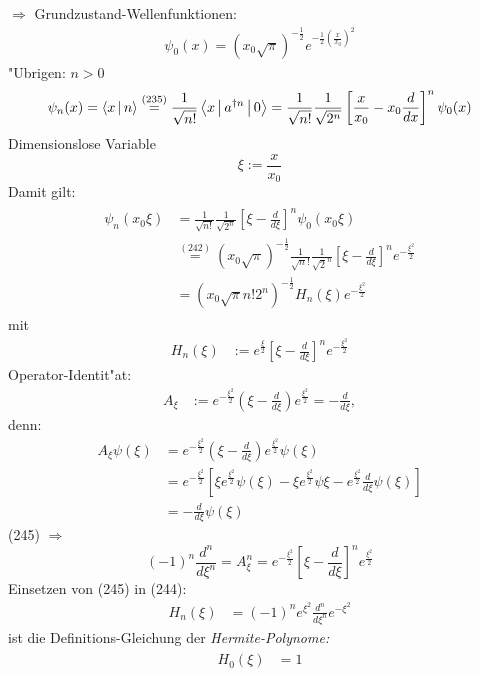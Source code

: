 \documentclass[a4paper]{scrartcl}
\begin{document}
{$\Longrightarrow$ Grundzustand-Wellenfunktionen:
\begin{align}
\psi_0(x) = (x_0 \sqrt \pi)^{-\frac 12 } e^{-\frac 12 \left( \frac x {x_0} \right)^2}
\end{align}
"Ubrigen: $n > 0$
$$\psi_n(x) = \Braket{ x | n } \stackrel{(235)}= \frac 1{\sqrt{n!}} \Braket{ x | a^{\dagger n} | 0} = \frac1{\sqrt{n!}} \frac1{\sqrt{2^n}} \left[ \frac x{x_0} - x_0 \frac d {dx} \right]^n \psi_0(x)$$
Dimensionslose Variable
$$\xi := \frac x{x_0}$$
Damit gilt:
\begin{align}
\begin{split}
\psi_n(x_0 \xi) & = \frac1{\sqrt{n!}} \frac1{\sqrt{2^n}} \left[ \xi - \frac d{d \xi} \right]^n \psi_0(x_0 \xi) \\
& \stackrel{(242)}= (x_0 \sqrt \pi)^{-\frac12} \frac1{\sqrt n!} \frac1{\sqrt2^n} \left[ \xi -  \frac d {d\xi} \right]^n e^{-\frac {\xi^2} 2} \\
& = (x_0 \sqrt \pi n! 2^n)^{-\frac 12} H_n(\xi) e^{-\frac {\xi^2}2}
\end{split}
\end{align}
mit
\begin{align}
H_n(\xi) & := e^{\frac \xi 2} \left[ \xi - \frac d {d\xi} \right]^n e^{-\frac {\xi^2}2}
\end{align}
Operator-Identit"at:
\begin{align}
A_\xi &:= e^{-\frac {\xi^2}2} \left( \xi - \frac d{d\xi} \right) e^{\frac {\xi^2}2} = - \frac d{d\xi},
\end{align}
denn:
\begin{align*}
A_\xi \psi(\xi) & = e^{- \frac{\xi^2}2} \left( \xi - \frac d {d\xi} \right) e^{\frac{\xi^2}2} \psi(\xi) \\
& = e^{-\frac{\xi^2}2} \left[ \xi e^{\frac{\xi^2}2} \psi(\xi) - \xi e^{\frac{\xi^2}2}\psi{\xi} - e^{\frac{\xi^2}2 } \frac d{d\xi} \psi(\xi) \right] \\
& = - \frac d{d\xi} \psi(\xi)
\end{align*}
(245) $\Longrightarrow$
$$ (-1)^n \frac{d^n}{d\xi^n} = A_\xi^n
 = e^{-\frac{\xi^2}2} \left[ \xi - \frac d{d\xi} \right]^n e^{\frac {\xi^2}2}$$
Einsetzen von (245) in (244):
\begin{align}
H_n(\xi) & = (-1)^n e^{\xi^2} \frac{d^n}{d \xi^n} e^{- \xi^2}
\end{align}
ist die Definitions-Gleichung der \emph{Hermite-Polynome:}
\begin{align}
\begin{split}
H_0(\xi) & = 1 \\

\end{split}
\end{align}}
\end{document}
